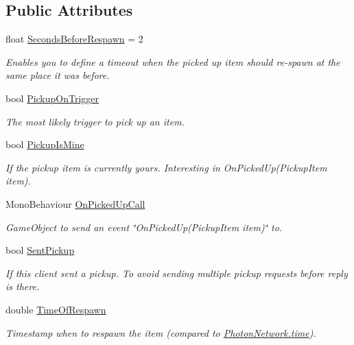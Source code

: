 \subsection*{Public Attributes}
\begin{DoxyCompactItemize}
\item 
float \hyperlink{class_pickup_item_a026d74417bd3cebea3076b676bee27b8}{Seconds\+Before\+Respawn} = 2
\begin{DoxyCompactList}\small\item\em Enables you to define a timeout when the picked up item should re-\/spawn at the same place it was before. \end{DoxyCompactList}\item 
bool \hyperlink{class_pickup_item_a6fb1c4a94bef1e321638b430e27141d1}{Pickup\+On\+Trigger}
\begin{DoxyCompactList}\small\item\em The most likely trigger to pick up an item. \end{DoxyCompactList}\item 
bool \hyperlink{class_pickup_item_a5b7ca0ead3f54bdf3ae3fbb0d80607f3}{Pickup\+Is\+Mine}
\begin{DoxyCompactList}\small\item\em If the pickup item is currently yours. Interesting in On\+Picked\+Up(\+Pickup\+Item item).\end{DoxyCompactList}\item 
Mono\+Behaviour \hyperlink{class_pickup_item_a48a1fe620e9fecb4e8825c48723140c4}{On\+Picked\+Up\+Call}
\begin{DoxyCompactList}\small\item\em Game\+Object to send an event \char`\"{}\+On\+Picked\+Up(\+Pickup\+Item item)\char`\"{} to. \end{DoxyCompactList}\item 
bool \hyperlink{class_pickup_item_a2cb53f4bb11cda01690309bf2de67894}{Sent\+Pickup}
\begin{DoxyCompactList}\small\item\em If this client sent a pickup. To avoid sending multiple pickup requests before reply is there.\end{DoxyCompactList}\item 
double \hyperlink{class_pickup_item_a73055debb47c9bcf0813e74a0fd6e3ee}{Time\+Of\+Respawn}
\begin{DoxyCompactList}\small\item\em Timestamp when to respawn the item (compared to \hyperlink{class_photon_network_a86ab96957666ef72830a35662ef3d30b}{Photon\+Network.\+time}). \end{DoxyCompactList}\end{DoxyCompactItemize}
